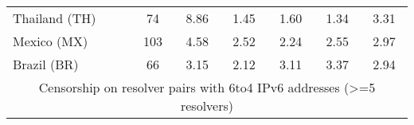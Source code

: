 \begin{table}[h!]
{\begin{tabular}{lcccccc}
Thailand (TH) & \color{black} 74 & {\cellcolor[HTML]{6AAED6}} \color[HTML]{F1F1F1} \color{black} 8.86 & {\cellcolor[HTML]{F6FAFF}} \color[HTML]{000000} \color{black} 1.45 & {\cellcolor[HTML]{F4F9FE}} \color[HTML]{000000} \color{black} 1.60 & {\cellcolor[HTML]{F7FBFF}} \color[HTML]{000000} \color{black} 1.34 & \color{black} 3.31 \\
Mexico (MX) & \color{black} 103 & {\cellcolor[HTML]{6AAED6}} \color[HTML]{F1F1F1} \color{black} 4.58 & {\cellcolor[HTML]{EBF3FB}} \color[HTML]{000000} \color{black} 2.52 & {\cellcolor[HTML]{F7FBFF}} \color[HTML]{000000} \color{black} 2.24 & {\cellcolor[HTML]{EAF3FB}} \color[HTML]{000000} \color{black} 2.55 & \color{black} 2.97 \\
Brazil (BR) & \color{black} 66 & {\cellcolor[HTML]{8DC1DD}} \color[HTML]{000000} \color{black} 3.15 & {\cellcolor[HTML]{F7FBFF}} \color[HTML]{000000} \color{black} 2.12 & {\cellcolor[HTML]{95C5DF}} \color[HTML]{000000} \color{black} 3.11 & {\cellcolor[HTML]{6AAED6}} \color[HTML]{F1F1F1} \color{black} 3.37 & \color{black} 2.94 \\

    \midrule
    \multicolumn{7}{c}{Censorship on resolver pairs with 6to4 IPv6 addresses
    (>=5 resolvers)}\\
    \midrule


\end{tabular}}
\end{table}
